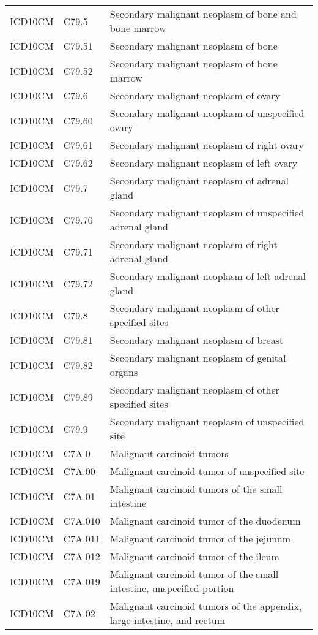 \begin{table}[ht]
\begin{tabular}{lll}
  ICD10CM & C79.5 & Secondary malignant neoplasm of bone and bone marrow \\ 
  ICD10CM & C79.51 & Secondary malignant neoplasm of bone \\ 
  ICD10CM & C79.52 & Secondary malignant neoplasm of bone marrow \\ 
  ICD10CM & C79.6 & Secondary malignant neoplasm of ovary \\ 
  ICD10CM & C79.60 & Secondary malignant neoplasm of unspecified ovary \\ 
  ICD10CM & C79.61 & Secondary malignant neoplasm of right ovary \\ 
  ICD10CM & C79.62 & Secondary malignant neoplasm of left ovary \\ 
  ICD10CM & C79.7 & Secondary malignant neoplasm of adrenal gland \\ 
  ICD10CM & C79.70 & Secondary malignant neoplasm of unspecified adrenal gland \\ 
  ICD10CM & C79.71 & Secondary malignant neoplasm of right adrenal gland \\ 
  ICD10CM & C79.72 & Secondary malignant neoplasm of left adrenal gland \\ 
  ICD10CM & C79.8 & Secondary malignant neoplasm of other specified sites \\ 
  ICD10CM & C79.81 & Secondary malignant neoplasm of breast \\ 
  ICD10CM & C79.82 & Secondary malignant neoplasm of genital organs \\ 
  ICD10CM & C79.89 & Secondary malignant neoplasm of other specified sites \\ 
  ICD10CM & C79.9 & Secondary malignant neoplasm of unspecified site \\ 
  ICD10CM & C7A.0 & Malignant carcinoid tumors \\ 
  ICD10CM & C7A.00 & Malignant carcinoid tumor of unspecified site \\ 
  ICD10CM & C7A.01 & Malignant carcinoid tumors of the small intestine \\ 
  ICD10CM & C7A.010 & Malignant carcinoid tumor of the duodenum \\ 
  ICD10CM & C7A.011 & Malignant carcinoid tumor of the jejunum \\ 
  ICD10CM & C7A.012 & Malignant carcinoid tumor of the ileum \\ 
  ICD10CM & C7A.019 & Malignant carcinoid tumor of the small intestine, unspecified portion \\ 
  ICD10CM & C7A.02 & Malignant carcinoid tumors of the appendix, large intestine, and rectum \\ 

\end{tabular}
\end{table}
